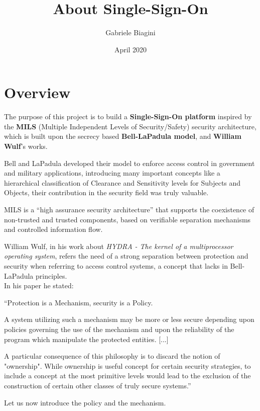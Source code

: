 \documentclass{article}
\title{About Single-Sign-On}
\author{Gabriele Biagini}
\date{April 2020}
\begin{document}
\maketitle
\newpage
\tableofcontents
\newpage

\section{Overview}
The purpose of this project is to build a \textbf{Single-Sign-On platform} inspired by the \textbf{MILS} (Multiple Independent Levels of Security/Safety) security architecture, which is built upon the secrecy based \textbf{Bell-LaPadula model}, and \textbf{William Wulf}'s works.
\medskip

Bell and LaPadula developed their model to enforce access control in government and military applications, introducing many important concepts like a hierarchical classification of Clearance and Sensitivity levels for Subjects and Objects, their contribution in the security field was truly valuable.
\medskip

MILS is a ``high assurance security architecture''\cite{MILS} that supports the coexistence of non-trusted and trusted components, based on verifiable separation mechanisms and controlled information flow.
\medskip

William Wulf, in his work about \emph{HYDRA - The kernel of a multiprocessor operating system}, refers the need of a strong separation between protection and security when referring to access control systems, a concept that lacks in Bell-LaPadula principles.\\
In his paper he stated:

\begin{displayquote}
``Protection is a Mechanism, security is a Policy. 
 
A system utilizing such a mechanism may be more or less secure depending upon policies governing the use of the mechanism and upon the reliability of the program which manipulate the protected entities. [...]

A particular consequence of this philosophy is to discard the notion of "ownership". 
While ownership is useful concept for certain security strategies, to include a concept at the most primitive levels would lead to the exclusion of the construction of certain other classes of truly secure systems.''\cite{hydra}
\end{displayquote}

Let us now introduce the policy and the mechanism.
\end{document}
